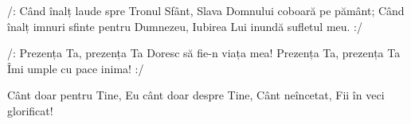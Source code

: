 \beginverse
/: Când înalț laude spre Tronul Sfânt,
Slava Domnului coboară pe pământ;
Când înalț imnuri sfinte pentru Dumnezeu,
Iubirea Lui inundă sufletul meu. :/
\endverse

\beginchorus
/: Prezența Ta, prezența Ta
Doresc să fie-n viața mea!
Prezența Ta, prezența Ta
Îmi umple cu pace inima! :/
\endchorus

\beginverse*
Cânt doar pentru Tine,
Eu cânt doar despre Tine,
Cânt neîncetat,
Fii în veci glorificat!
\endverse
\endsong